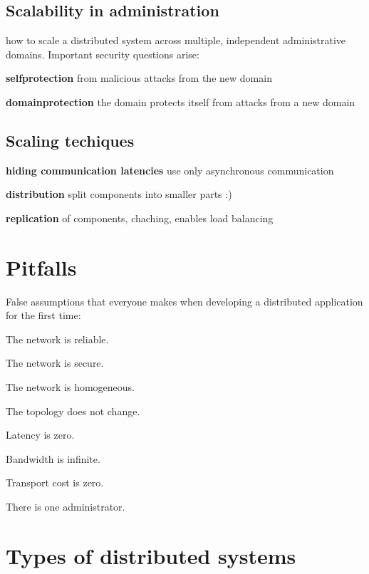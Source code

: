\documentclass[ngerman,a4paper]{report}
\begin{document}
\subsection{Scalability in administration}
how to scale a distributed system across multiple, independent administrative domains. Important security questions arise:
\begin{compactitem}
\item [\textbf{selfprotection}] from malicious attacks from the new domain
\item [\textbf{domainprotection}] the domain protects itself from attacks from a new domain
\end{compactitem}

\subsection{Scaling techiques}
\begin{compactitem}
\item [\textbf{hiding communication latencies}] use only asynchronous communication
\item [\textbf{distribution}] split components into smaller parts :)
\item [\textbf{replication}] of components, chaching, enables load balancing
\end{compactitem}

\section{Pitfalls}
False assumptions that everyone makes when developing a distributed application for the first time:
\begin{compactenum}
\item The network is reliable.
\item The network is secure.
\item The network is homogeneous.
\item The topology does not change.
\item Latency is zero.
\item Bandwidth is infinite.
\item Transport cost is zero.
\item There is one administrator.
\end{compactenum}

\section{Types of distributed systems}
\end{document}
